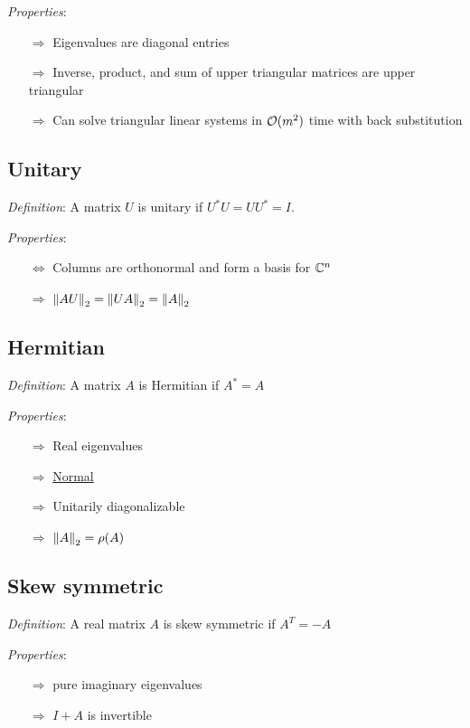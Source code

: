 \documentclass[12pt]{article}
\begin{document}
\textit{Properties}:
\begin{itemize}[nolistsep]
    \item[\(\Rightarrow\)] Eigenvalues are diagonal entries
    \item[\(\Rightarrow\)] Inverse, product, and sum of upper triangular matrices are upper triangular
    \item[\(\Rightarrow\)] Can solve triangular linear systems in \( \mathcal{O}(m^2) \) time with back substitution
\end{itemize}


\subsection{Unitary}
\textit{Definition}: A matrix \( U \) is unitary if \( U^*U = UU^* = I  \).

\textit{Properties}:
\begin{itemize}[nolistsep]
    \item[\(\Leftrightarrow\)] Columns are orthonormal and form a basis for \( \mathbb{C}^n \)
    \item[\(\Rightarrow\)] \( \left\lVert AU\right\rVert_2 = \left\lVert UA\right\rVert_2 = \left\lVert A\right\rVert_2 \)
\end{itemize}


\subsection{Hermitian}
\textit{Definition}: A matrix \( A \) is Hermitian if \( A^* = A \)

\textit{Properties}:
\begin{itemize}[nolistsep]
    \item[\(\Rightarrow\)] Real eigenvalues
    \item[\(\Rightarrow\)] \hyperref[sec:normal]{Normal}
    \item[\(\Rightarrow\)] Unitarily diagonalizable
    \item[\(\Rightarrow\)] \( \left\lVert A\right\rVert_2 = \rho(A) \)
\end{itemize}


\subsection{Skew symmetric}
\textit{Definition}: A real matrix \( A \) is skew symmetric if \( A^T = -A \)

\textit{Properties}:
\begin{itemize}[nolistsep]
    \item[\(\Rightarrow\)] pure imaginary eigenvalues
    \item[\(\Rightarrow\)] \( I+A \) is invertible
\end{itemize}
\end{document}
